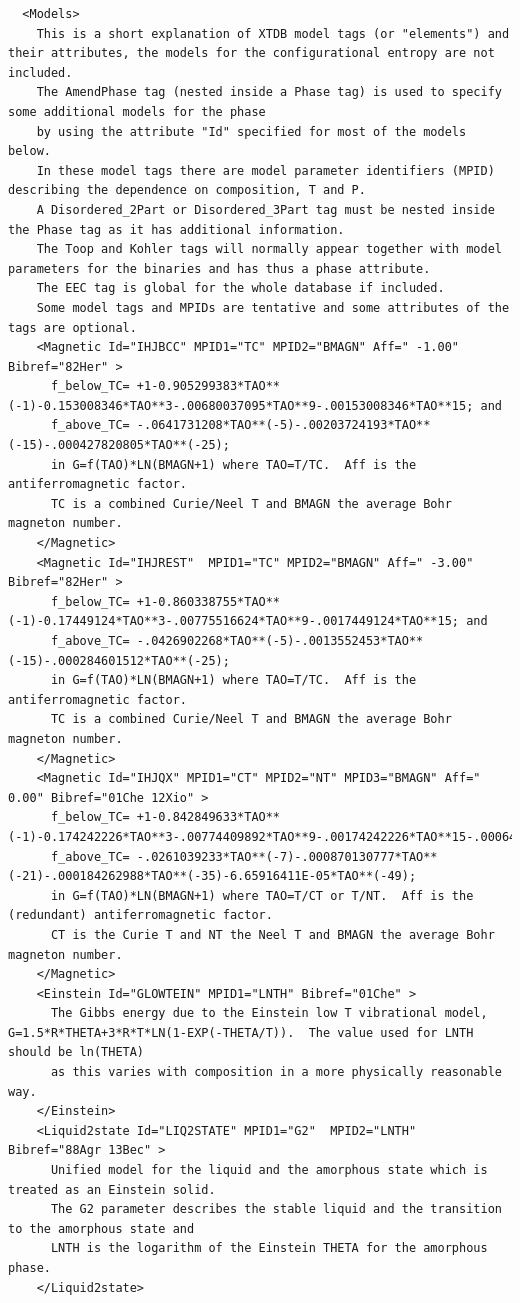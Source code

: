 \documentclass{article}
\begin{document}
\begin{appendices}
{\small
\begin{verbatim}
  <Models>
    This is a short explanation of XTDB model tags (or "elements") and their attributes, the models for the configurational entropy are not included.
    The AmendPhase tag (nested inside a Phase tag) is used to specify some additional models for the phase
    by using the attribute "Id" specified for most of the models below.
    In these model tags there are model parameter identifiers (MPID) describing the dependence on composition, T and P.
    A Disordered_2Part or Disordered_3Part tag must be nested inside the Phase tag as it has additional information.
    The Toop and Kohler tags will normally appear together with model parameters for the binaries and has thus a phase attribute.
    The EEC tag is global for the whole database if included.
    Some model tags and MPIDs are tentative and some attributes of the tags are optional.
    <Magnetic Id="IHJBCC" MPID1="TC" MPID2="BMAGN" Aff=" -1.00" Bibref="82Her" > 
      f_below_TC= +1-0.905299383*TAO**(-1)-0.153008346*TAO**3-.00680037095*TAO**9-.00153008346*TAO**15; and
      f_above_TC= -.0641731208*TAO**(-5)-.00203724193*TAO**(-15)-.000427820805*TAO**(-25); 
      in G=f(TAO)*LN(BMAGN+1) where TAO=T/TC.  Aff is the antiferromagnetic factor.
      TC is a combined Curie/Neel T and BMAGN the average Bohr magneton number.
    </Magnetic>
    <Magnetic Id="IHJREST"  MPID1="TC" MPID2="BMAGN" Aff=" -3.00" Bibref="82Her" > 
      f_below_TC= +1-0.860338755*TAO**(-1)-0.17449124*TAO**3-.00775516624*TAO**9-.0017449124*TAO**15; and 
      f_above_TC= -.0426902268*TAO**(-5)-.0013552453*TAO**(-15)-.000284601512*TAO**(-25); 
      in G=f(TAO)*LN(BMAGN+1) where TAO=T/TC.  Aff is the antiferromagnetic factor.
      TC is a combined Curie/Neel T and BMAGN the average Bohr magneton number.
    </Magnetic>
    <Magnetic Id="IHJQX" MPID1="CT" MPID2="NT" MPID3="BMAGN" Aff=" 0.00" Bibref="01Che 12Xio" > 
      f_below_TC= +1-0.842849633*TAO**(-1)-0.174242226*TAO**3-.00774409892*TAO**9-.00174242226*TAO**15-.000646538871*TAO**21;
      f_above_TC= -.0261039233*TAO**(-7)-.000870130777*TAO**(-21)-.000184262988*TAO**(-35)-6.65916411E-05*TAO**(-49);
      in G=f(TAO)*LN(BMAGN+1) where TAO=T/CT or T/NT.  Aff is the (redundant) antiferromagnetic factor.
      CT is the Curie T and NT the Neel T and BMAGN the average Bohr magneton number.
    </Magnetic>
    <Einstein Id="GLOWTEIN" MPID1="LNTH" Bibref="01Che" > 
      The Gibbs energy due to the Einstein low T vibrational model, G=1.5*R*THETA+3*R*T*LN(1-EXP(-THETA/T)).  The value used for LNTH should be ln(THETA)
      as this varies with composition in a more physically reasonable way.
    </Einstein>
    <Liquid2state Id="LIQ2STATE" MPID1="G2"  MPID2="LNTH" Bibref="88Agr 13Bec" > 
      Unified model for the liquid and the amorphous state which is treated as an Einstein solid.
      The G2 parameter describes the stable liquid and the transition to the amorphous state and
      LNTH is the logarithm of the Einstein THETA for the amorphous phase.
    </Liquid2state>
\end{verbatim}
}


\end{appendices}
\end{document}
